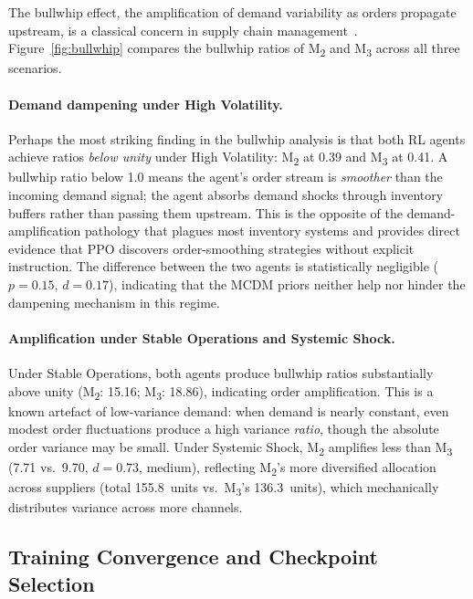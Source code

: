 \documentclass[preprint,12pt]{elsarticle}
\begin{document}
The bullwhip effect, the amplification of demand variability as orders propagate upstream, is a classical concern in supply chain management~\citep{Ivanov_Dolgui_2021}.
Figure~\ref{fig:bullwhip} compares the bullwhip ratios of M\textsubscript{2} and M\textsubscript{3} across all three scenarios.

\paragraph{Demand dampening under High Volatility.}
Perhaps the most striking finding in the bullwhip analysis is that both RL agents achieve ratios \emph{below unity} under High Volatility: M\textsubscript{2} at 0.39 and M\textsubscript{3} at 0.41.
A bullwhip ratio below 1.0 means the agent's order stream is \emph{smoother} than the incoming demand signal; the agent absorbs demand shocks through inventory buffers rather than passing them upstream.
This is the opposite of the demand-amplification pathology that plagues most inventory systems and provides direct evidence that PPO discovers order-smoothing strategies without explicit instruction.
The difference between the two agents is statistically negligible ($p = 0.15$, $d = 0.17$), indicating that the MCDM priors neither help nor hinder the dampening mechanism in this regime.

\paragraph{Amplification under Stable Operations and Systemic Shock.}
Under Stable Operations, both agents produce bullwhip ratios substantially above unity (M\textsubscript{2}: 15.16; M\textsubscript{3}: 18.86), indicating order amplification.
This is a known artefact of low-variance demand: when demand is nearly constant, even modest order fluctuations produce a high variance \emph{ratio}, though the absolute order variance may be small.
Under Systemic Shock, M\textsubscript{2} amplifies less than M\textsubscript{3} (7.71 vs.\ 9.70, $d = 0.73$, medium), reflecting M\textsubscript{2}'s more diversified allocation across suppliers (total 155.8~units vs.\ M\textsubscript{3}'s 136.3~units), which mechanically distributes variance across more channels.

\subsection{Training Convergence and Checkpoint Selection}
\label{sec:learning}
\end{document}

